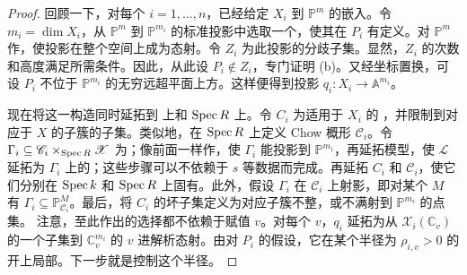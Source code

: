 \begin{proof}
回顾一下，对每个 $i=1,\ldots,n$，已经给定 $X_i$ 到 $\mathbb P^m$ 的嵌入。令 $m_i=\dim X_i$，从 $\mathbb P^m$ 到 $\mathbb P^{m_i}$ 的标准投影中选取一个，使其在 $P_i$ 有定义。对 $\mathbb P^m$ 作，使投影在整个空间上成为态射。令 $Z_i$ 为此投影的分歧子集。显然，$Z_i$ 的次数和高度满足所需条件。因此，从此设 $P_i\notin Z_i$，专门证明 (b)。又经坐标置换，可设 $P_i$ 不位于 $\mathbb P^{m_i}$ 的无穷远超平面上方。这样便得到投影 $q_i:X_i\to\mathbb A^{m_i}$。

现在将这一构造同时延拓到 上和 $\operatorname{Spec} R$ 上。令 $C_i$ 为适用于 $X_i$ 的 ，并限制到对应于 $X$ 的子簇的子集。类似地，在 $\operatorname{Spec} R$ 上定义 Chow 概形 $\mathscr C_i$。令 $\Gamma_i\subseteq\mathscr C_i\times_{\operatorname{Spec} R}\mathscr X$ 为；像前面一样作，使 $\Gamma_i$ 能投影到 $\mathbb P^{m_i}$，再延拓模型，使 $\mathscr L$ 延拓为 $\Gamma_i$ 上的；这些步骤可以不依赖于 $s$ 等数据而完成。再延拓 $C_i$ 和 $\mathscr C_i$，使它们分别在 $\operatorname{Spec} k$ 和 $\operatorname{Spec} R$ 上固有。此外，假设 $\Gamma_i$ 在 $\mathscr C_i$ 上射影，即对某个 $M$ 有 $\Gamma_i\subseteq\mathbb P^M_{\mathscr C_i}$。最后，将 $C_i$ 的坏子集定义为对应子簇不整，或不满射到 $\mathbb P^{m_i}$ 的点集。
注意，至此作出的选择都不依赖于赋值 $v$。对每个 $v$，$q_i$ 延拓为从 $\mathscr X_i(\mathbb C_v)$ 的一个子集到 $\mathbb C_v^{m_i}$ 的 $v$ 进解析态射。由对 $P_i$ 的假设，它在某个半径为 $\rho_{i,v}>0$ 的开上局部。下一步就是控制这个半径。


\end{proof}
